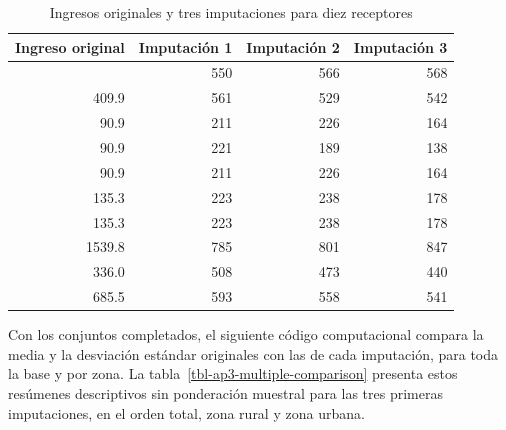 \documentclass[
  spanish,
  11pt,
  letterpaper,
  oneside,
  open=any]{scrbook}
\begin{document}
{

\begin{longtable}[]{@{}rrrr@{}}

\caption{\label{tbl-ap3-imputation-examples}Ingresos originales y tres
imputaciones para diez receptores}

\tabularnewline

\toprule\noalign{}
Ingreso original & Imputación 1 & Imputación 2 & Imputación 3 \\
\midrule\noalign{}
\endhead
\bottomrule\noalign{}
\endlastfoot
409.9 & 550 & 566 & 568 \\
409.9 & 561 & 529 & 542 \\
90.9 & 211 & 226 & 164 \\
90.9 & 221 & 189 & 138 \\
90.9 & 211 & 226 & 164 \\
135.3 & 223 & 238 & 178 \\
135.3 & 223 & 238 & 178 \\
1539.8 & 785 & 801 & 847 \\
336.0 & 508 & 473 & 440 \\
685.5 & 593 & 558 & 541 \\

\end{longtable}

}

Con los conjuntos completados, el siguiente código computacional compara
la media y la desviación estándar originales con las de cada imputación,
para toda la base y por zona. La tabla~\ref{tbl-ap3-multiple-comparison}
presenta estos resúmenes descriptivos sin ponderación muestral para las
tres primeras imputaciones, en el orden total, zona rural y zona urbana.
\end{document}

